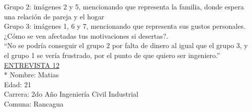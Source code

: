 Grupo 2: imágenes 2 y 5, mencionando que representa la familia, donde espera una relación de pareja y el hogar\\

Grupo 3: imágenes 1, 6 y 7, mencionando que representa sus gustos personales.\\

¿Cómo se ven afectadas tus motivaciones si desertas?.\\

``No se podría conseguir el grupo 2 por falta de dinero al igual que el grupo 3, y el grupo 1 se vería frustrado, por el punto de que quiero ser ingeniero.'' \\

\underline {ENTREVISTA 12}\\*
Nombre: Matias\\
Edad: 21\\
Carrera: 2do Año Ingeniería Civil Industrial\\
Comuna: Rancagua\\

